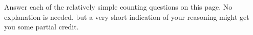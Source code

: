 \documentclass[11pt]{exam}
\begin{document}
\begin{questions}
\begin{parts}
\end{parts}




\newpage


\question[12] Answer each of the relatively simple counting questions on this page.  No explanation is needed, but a very short indication of your reasoning might get you some partial credit.

\end{questions}
\end{document}
